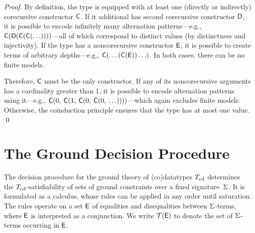 \begin{report}
\begin{proof}
By definition, the type is equipped with at least one (directly or indirectly)
corecursive constructor $\textsf{C}$. If it additional has second
corecursive constructor $\textsf{D}$, it is possible to encode infinitely many
alternation patterns---e.g.,
$\textsf{C}(\textsf{D}(\textsf{C}(\textsf{C}(\ldots))))$---all of which correspond
to distinct values (by distinctness and injectivity). If the type has a
noncorecursive constructor $\textsf{E}$, it is possible to create terms of
arbitrary depths---e.g., $\textsf{C}(\ldots(\textsf{C}(\textsf{E}))\ldots)$. In
both cases, there can be no finite models.

Therefore, $\textsf{C}$ must be the only constructor.
If any of its noncorecursive arguments has a cardinality greater than 1,
it is possible to encode alternation patterns using it---e.g.,
$\textsf{C}(0,\: \textsf{C}(1,\: \textsf{C}(0,\: \textsf{C}(0,\: \ldots))))$---which
again excludes finite models. Otherwise, the coinduction principle ensures
that the type has at most one value.
\qed
\end{proof}
\end{report}


\section{The Ground Decision Procedure} %
\label{sec:a-ground-decision-procedure-for-co-datatypes}

The decision procedure for the ground theory of (co)datatypes $T_{\mathrm{cd}}$ determines the
$T_{\mathrm{cd}}$-satisfiability of sets of ground constraints over a fixed
signature~$\mathrm{\Sigma}$. It is formulated as a calculus, whose rules can be applied in
any order until saturation.
%
The rules operate on a set $\mathsf{E}$ of equalities and disequalities
between $\mathrm{\Sigma}$-terms, where $\mathsf{E}$ is interpreted as a conjunction.
We write $\mathcal{T}(\mathsf{E})$ to denote the set of $\mathrm{\Sigma}$-terms occurring in $\mathsf{E}$.

